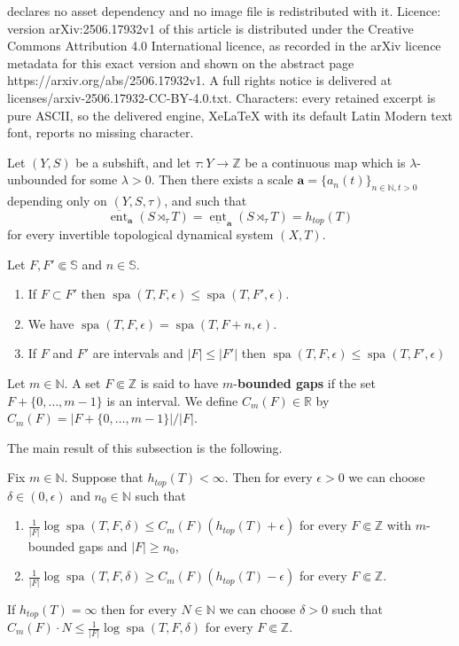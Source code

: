 \documentclass[10pt,a4paper]{amsart}
\newcommand{\N}{\mathbb{N}}
\newcommand{\R}{\mathbb{R}}
\newcommand{\SE}{\mathbb{S}}
\newcommand{\Z}{\mathbb{Z}}
\newcommand{\lowerent}{\underline{\operatorname{ent}}}
\newcommand{\spa}{\operatorname{spa}}
\newcommand{\upperent}{\overline{\operatorname{ent}}}
\begin{document}
declares no asset dependency and no image file is redistributed with it. Licence: version arXiv:2506.17932v1 of this article is distributed under the Creative Commons Attribution 4.0 International licence, as recorded in the arXiv licence metadata for this exact version and shown on the abstract page https://arxiv.org/abs/2506.17932v1. A full rights notice is delivered at licenses/arxiv-2506.17932-CC-BY-4.0.txt. Characters: every retained excerpt is pure ASCII, so the delivered engine, XeLaTeX with its default Latin Modern text font, reports no missing character.
\begin{theorem}\label{thm:entropy}
Let $(Y,S)$ be a subshift, and let $\tau\colon Y\to \Z$ be a continuous map which is $\lambda$-unbounded for some $\lambda>0$. Then there exists a scale $\textbf{a}=\{a_n(t)\}_{n\in\N,t>0}$ depending only on $(Y,S,\tau)$, and such that
\[\upperent_{\textbf{a}}(S\rtimes_\tau T)=\lowerent_{\textbf{a}}(S\rtimes_\tau T)=h_{top}(T)\]  for every invertible topological dynamical system $(X,T)$.
\end{theorem} 

\begin{proposition}\label{monotony-properties-of-spa}Let $F,F'\Subset\SE$ and $n\in\SE$. 
    \begin{enumerate}
        \item If $F\subset F'$ then $\spa(T,F,\epsilon)\leq\spa(T,F',\epsilon)$. 
        \item We have $\spa(T,F,\epsilon)=\spa(T,F+n,\epsilon)$. 
        \item If $F$ and $F'$ are intervals and $|F|\leq |F'|$ then $\spa(T,F,\epsilon)\leq \spa(T,F',\epsilon)$
    \end{enumerate}
    \end{proposition}

\begin{definition}\label{constant-C_m} Let $m\in\N$. A set $F\Subset \Z$ is said to have $m$-\textbf{bounded gaps} if the set $F+\{0,\dots,m-1\}$ is an interval. We define $C_m(F)\in\R $ by $
C_m(F)=|F+\{0,\dots,m-1\}|/|F|$.
\end{definition} The main result of this subsection is the following.

\begin{proposition}\label{estimate}
Fix $m\in\N$. Suppose that $h_{top}(T)<\infty$. Then for every  $\epsilon>0$ we can choose $\delta\in (0,\epsilon)$ and $n_0\in\N$ such that
\begin{enumerate}
    \item $\frac{1}{|F|}\log \spa(T,F,\delta)\leq C_m(F) (h_{top}(T)+\epsilon)$ for every $F\Subset\Z$ with $m$-bounded gaps and $|F|\geq n_0$,
    \item $
    \frac{1}{|F|}\log \spa(T,F,\delta)\geq C_m(F) (h_{top}(T)-\epsilon)$ for every $F\Subset\Z$.
\end{enumerate}
    If $h_{top}(T)=\infty$ then for every $N\in\N$ we can choose $\delta>0$ such that $C_m(F)\cdot N\leq \frac{1}{|F|}\log \spa(T,F,\delta)$ for every $F\Subset\Z$.
\end{proposition} 
\end{document}
